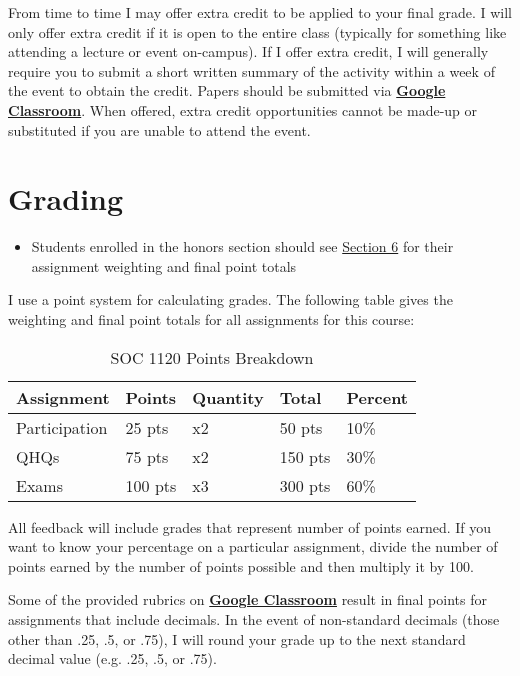 \documentclass[]{book}
\newenvironment{rmdblock}[1]
  {\begin{shaded*}
  \begin{itemize}
  \renewcommand{\labelitemi}{
    \raisebox{-.7\height}[0pt][0pt]{
      {\setkeys{Gin}{width=3em,keepaspectratio}\texttt{[image: images/\#1]}}
    }
  }
  \item
  }
  {
  \end{itemize}
  \end{shaded*}
  }
\newenvironment{rmdwarning}
  {\begin{rmdblock}{warning}}
  {\end{rmdblock}}
\begin{document}
From time to time I may offer extra credit to be applied to your final grade. I will only offer extra credit if it is open to the entire class (typically for something like attending a lecture or event on-campus). If I offer extra credit, I will generally require you to submit a short written summary of the activity within a week of the event to obtain the credit. Papers should be submitted via \textbf{\href{https://classroom.google.com}{Google Classroom}}. When offered, extra credit opportunities cannot be made-up or substituted if you are unable to attend the event.

\hypertarget{grading}{%
\section{Grading}\label{grading}}

\begin{rmdwarning}
Students enrolled in the honors section should see
\href{/honors-overview.html}{Section 6} for their assignment weighting
and final point totals
\end{rmdwarning}

I use a point system for calculating grades. The following table gives the weighting and final point totals for all assignments for this course:

\begin{table}[t]

\caption{\label{tab:unnamed-chunk-6}SOC 1120 Points Breakdown}
\centering
\begin{tabular}{lllll}
\toprule
Assignment & Points & Quantity & Total & Percent\\
\midrule
Participation & 25 pts & x2 & 50 pts & 10\%\\
QHQs & 75 pts & x2 & 150 pts & 30\%\\
Exams & 100 pts & x3 & 300 pts & 60\%\\
\bottomrule
\end{tabular}
\end{table}

All feedback will include grades that represent number of points earned. If you want to know your percentage on a particular assignment, divide the number of points earned by the number of points possible and then multiply it by 100.

Some of the provided rubrics on \textbf{\href{https://classroom.google.com}{Google Classroom}} result in final points for assignments that include decimals. In the event of non-standard decimals (those other than .25, .5, or .75), I will round your grade up to the next standard decimal value (e.g. .25, .5, or .75).
\end{document}
